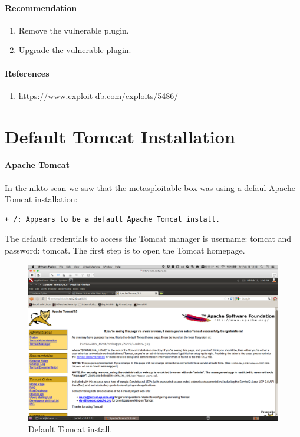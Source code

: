 \documentclass{article}
\begin{document}
\paragraph{Recommendation}

\begin{enumerate}
  \item Remove the vulnerable plugin.
  \item Upgrade the vulnerable plugin.
\end{enumerate}

\paragraph{References}

\begin{enumerate}
  \item https://www.exploit-db.com/exploits/5486/
\end{enumerate}

\newpage
\section{Default Tomcat Installation}

\paragraph{Apache Tomcat}
In the nikto scan we saw that the metasploitable box was using a defaul Apache
Tomcat installation:

\begin{lstlisting}
+ /: Appears to be a default Apache Tomcat install.
\end{lstlisting}

The default credentials to access the Tomcat manager is username: tomcat and password: tomcat.
The first step is to open the Tomcat homepage.

\begin{figure}[h!]
	\includegraphics[width=\linewidth]{images/tomcat-metasploitable.png}
	\caption{Default Tomcat install.}
	\label{fig:tomcat-injection1}
\end{figure}
\end{document}
